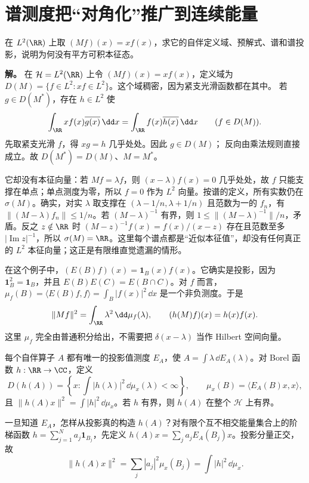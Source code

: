 \section{谱测度把“对角化”推广到连续能量}

\begin{example}[乘法算子的自伴域与连续谱]
在 $L^2(\RR)$ 上取 $(Mf)(x)=xf(x)$，求它的自伴定义域、预解式、谱和谱投影，说明为何没有平方可积本征态。

\textbf{解。} 在 \(\mathcal H=L^2(\RR)\) 上令 \((Mf)(x)=xf(x)\)，定义域为
\(D(M)=\{f\in L^2:xf\in L^2\}\)。这个域稠密，因为紧支光滑函数都在其中。
若 \(g\in D(M^*)\)，存在 \(h\in L^2\) 使
\[
\int_\RR xf(x)\overline{g(x)}\,\dd x
=\int_\RR f(x)\overline{h(x)}\,\dd x
\qquad(f\in D(M)).
\]
先取紧支光滑 \(f\)，得 \(xg=h\) 几乎处处。因此 \(g\in D(M)\)；
反向由乘法规则直接成立。故 \(D(M^*)=D(M)\)、\(M=M^*\)。

它却没有本征向量：若 \(Mf=\lambda f\)，则 \((x-\lambda)f(x)=0\) 几乎处处，故 \(f\) 只能支撑在单点；单点测度为零，所以 \(f=0\) 作为 \(L^2\) 向量。按谱的定义，所有实数仍在 \(\sigma(M)\)。确实，对实 \(\lambda\) 取支撑在 \((\lambda-1/n,\lambda+1/n)\) 且范数为一的 \(f_n\)，有 \(\|(M-\lambda)f_n\|\le1/n\)。若 \((M-\lambda)^{-1}\) 有界，则 \(1\le\|(M-\lambda)^{-1}\|/n\)，矛盾。反之 \(z\notin\RR\) 时 \((M-z)^{-1}f(x)=f(x)/(x-z)\) 存在且范数至多 \(|\operatorname{Im}z|^{-1}\)，所以 \(\sigma(M)=\RR\)。这里每个谱点都是“近似本征值”，却没有任何真正的 \(L^2\) 本征向量；这正是有限维直觉遗漏的情形。

在这个例子中，\((E(B)f)(x)=\mathbf1_B(x)f(x)\)。它确实是投影，因为 \(\mathbf1_B^2=\mathbf1_B\)，并且 \(E(B)E(C)=E(B\cap C)\)。对 \(f\) 而言，\(\mu_f(B)=\langle E(B)f,f\rangle=\int_B|f(x)|^2\,\dd x\) 是一个非负测度。于是
\[
\|Mf\|^2=\int_{\RR}\lambda^2\,\dd\mu_f(\lambda),
\qquad (h(M)f)(x)=h(x)f(x).
\]
这里 \(\mu_f\) 完全由普通积分给出，不需要把
\(\delta(x-\lambda)\) 当作 Hilbert 空间向量。
\end{example}

\begin{theorem}[自伴算子的谱定理]
每个自伴算子 \(A\) 都有唯一的投影值测度 \(E_A\)，使 \(A=\int\lambda\,\dd E_A(\lambda)\)。对 Borel 函数 \(h:\RR\to\CC\)，定义
\[
D(h(A))=\left\{x:\int|h(\lambda)|^2\,\dd\mu_x(\lambda)<\infty\right\},
\qquad \mu_x(B)=\langle E_A(B)x,x\rangle,
\]
且 \(\|h(A)x\|^2=\int|h|^2\,\dd\mu_x\)。若 \(h\) 有界，则 \(h(A)\) 在整个 \(\mathcal H\) 上有界。
\end{theorem}

一旦知道 \(E_A\)，怎样从投影真的构造 \(h(A)\)？对有限个互不相交能量集合上的阶梯函数 \(h=\sum_{j=1}^N a_j\mathbf1_{B_j}\)，先定义 \(h(A)x=\sum_j a_jE_A(B_j)x\)。投影分量正交，故
\[
 \|h(A)x\|^2=\sum_j|a_j|^2\mu_x(B_j)
 =\int|h|^2\,\dd\mu_x.
\]

